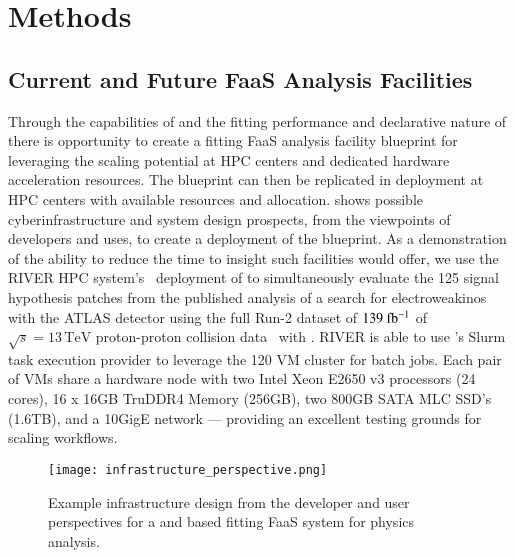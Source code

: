 \section{Methods}\label{sec:methods}
%

%

%
\subsection{Current and Future FaaS Analysis Facilities}\label{subsec:FaaS_analysis_facilities}

Through the capabilities of \funcX{} and the fitting performance and declarative nature of \pyhf{} there is opportunity to create a fitting FaaS analysis facility blueprint for leveraging the scaling potential at HPC centers and dedicated hardware acceleration resources.
The blueprint can then be replicated in deployment at HPC centers with available resources and allocation.
 shows possible cyberinfrastructure and system design prospects, from the viewpoints of developers and uses, to create a deployment of the blueprint.
As a demonstration of the ability to reduce the time to insight such facilities would offer, we use the RIVER HPC system's~\cite{RIVER_HPC} deployment of \funcX{} to simultaneously evaluate the 125 signal hypothesis patches from the published analysis of a search for electroweakinos with the ATLAS detector using the full Run-2 dataset of \(139~\ifb\) of \(\sqrt{s} = 13\,\text{TeV}\) proton-proton collision data~\cite{SUSY-2019-08} with \pyhf{}.
RIVER is able to use \funcX{}'s Slurm task execution provider to leverage the 120 VM cluster for batch jobs.
Each pair of VMs share a hardware node with two Intel Xeon E2650 v3 processors (24 cores), 16 x 16GB TruDDR4 Memory (256GB), two 800GB SATA MLC SSD's (1.6TB), and a 10GigE network --- providing an excellent testing grounds for scaling workflows.

\begin{figure}[!htpb]
    \centering
    \texttt{[image: infrastructure\_perspective.png]}
    \caption{Example infrastructure design from the developer and user perspectives for a \pyhf{} and \funcX{} based fitting FaaS system for physics analysis.~\cite{portable_inference_workshop}}
    \label{fig:infrastructure_perspective}
\end{figure}

